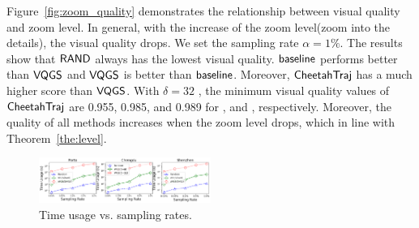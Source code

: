 Figure~\ref{fig:zoom_quality} demonstrates the relationship between visual quality and zoom level. In general, with the increase of the zoom level(zoom into the details), the visual quality drops.
We set the sampling rate $\alpha=1\%$. The results show that $\mathsf{RAND}$ always has the lowest  visual quality. $\mathsf{baseline}$ performs better than $\mathsf{VQGS}$ and $\mathsf{VQGS}$ is better than $\mathsf{baseline}$. Moreover, $\mathsf{CheetahTraj}$ has a much higher score than $\mathsf{VQGS}$. With $\delta=32$ , the minimum visual quality values of $\mathsf{CheetahTraj}$ are 0.955, 0.985, and 0.989 for \pt{}, \cd{} and \sz{}, respectively. Moreover, the quality of all methods increases when the zoom level drops, which in line with Theorem~\ref{the:level}.




\begin{figure}[t]
	\centering
	\includegraphics[width=0.5\textwidth]{pictures/quantitative_study_icde/sample_time.png}
	\vspace{-8mm}
	\caption{Time usage vs. sampling rates.}
	\label{fig:sample_time}
	\vspace{-3mm}
\end{figure}

